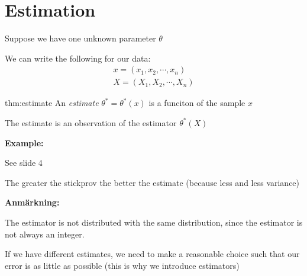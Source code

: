 \section{Estimation}\par
\noindent Suppose we have one unknown parameter $\theta$
\par\bigskip
\noindent We can write the following for our data:
\begin{equation*}
  \begin{gathered}
    x = (x_1,x_2,\cdots,x_n)\\
    X = (X_1,X_2,\cdots,X_n)
  \end{gathered}
\end{equation*}
\par\bigskip
\begin{theo}{thm:estimate}
  An \textit{estimate} $\theta^* = \theta^*(x)$ is a funciton of the sample $x$
  \par\bigskip
  \noindent The estimate is an observation of the estimator $\theta^*(X)$
\end{theo}
\par\bigskip
\noindent\textbf{Example:}\par
\noindent See slide 4
\par\bigskip
\noindent The greater the stickprov the better the estimate (because less and less variance)
\par\bigskip
\noindent\textbf{Anmärkning:}\par
\noindent The estimator is not distributed with the same distribution, since the estimator is not always an integer.
\par\bigskip
\noindent If we have different estimates, we need to make a reasonable choice such that our error is as little as possible (this is why we introduce estimators)
\par\bigskip
